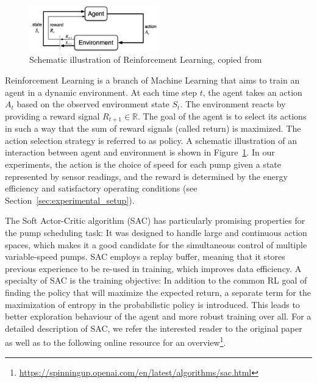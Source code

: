 \begin{figure}
\centering
\includegraphics[width=0.5\textwidth]{Figures/agent_environment_model.png}
\caption{Schematic illustration of Reinforcement Learning, copied from
\cite{sutton_reinforcement_2018}}
\label{fig:agent_environment_model}
\end{figure}
Reinforcement Learning is a branch of Machine Learning that aims to train an
agent in a dynamic environment. At each time step $t$, the agent takes an
action $A_t$ based on the observed environment state $S_t$. The
environment reacts by providing a reward signal $R_{t+1} \in \mathbb{R}$. The
goal of the agent is to select its actions in such a way that the sum of
reward signals (called return) is maximized. The action selection strategy is
referred to as policy. A schematic illustration of an interaction
between agent and environment is shown in Figure~\ref{fig:agent_environment_model}.
In our experiments, the action is the choice of speed for
each pump given a state represented by sensor readings,
and the reward is determined by the energy efficiency and satisfactory operating conditions
(see Section~\ref{sec:experimental_setup}).

The Soft Actor-Critic algorithm (SAC)
\cite{haarnoja_soft_2018} has
particularly promising properties for the pump scheduling task: It was
designed to handle large and continuous action spaces, which makes it a good
candidate for the simultaneous control of multiple variable-speed pumps. SAC
employs a replay buffer, meaning that it stores previous experience to be
re-used in training, which improves data efficiency. A specialty of SAC is the training objective: In
addition to the common RL goal of finding the policy that will maximize the
expected return, a separate term for the maximization
of entropy in the probabilistic policy is introduced.
This leads to better exploration behaviour of the agent and more robust
training over all. For a detailed description of SAC, we refer the
interested reader to the original paper \cite{haarnoja_soft_2018} as well as
to the following online resource for an
overview\footnote{\href{https://spinningup.openai.com/en/latest/algorithms/sac.html}{https://spinningup.openai.com/en/latest/algorithms/sac.html}}.
